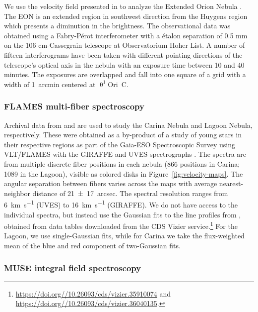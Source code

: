 \documentclass[fleqn,usenatbib, useAMS, a4paper]{mnras}
\begin{document}
We use the velocity field presented in \citet{1987A&A...176..347H} to analyze the Extended Orion Nebula \citetext{EON henceforth;  \citealp{2008Sci...319..309G}}.
The EON is an extended region in southwest direction from the Huygens region which presents a diminution in the brightness.
The observational data was obtained using a Fabry-Pérot interferometer with a étalon separation of 0.5 mm on the 106 cm-Cassegrain telescope at Observatorium Hoher List. 
A number of fifteen interferograms have been taken with different pointing directions of the telescope's optical axis in the nebula with an exposure time between 10 and 40 minutes. 
The exposures are overlapped and fall into one square of a grid with a width of \SI{1}{arcmin} centered at \(\uptheta^{1}\)Ori~C.   


\subsubsection{FLAMES multi-fiber spectroscopy}
\label{sec:flames-multi-fiber}

Archival data from \citet{Damiani:2016a} and \citet{Damiani:2017b} are used
to study the Carina Nebula and Lagoon Nebula, respectively.
These were obtained as a by-product of a study of young stars in their respective regions
as part of the Gaia-ESO Spectroscopic Survey \citep{Gilmore:2012v, Randich:2013m}
using VLT/FLAMES with the GIRAFFE and UVES spectrographs \citep{2002Msngr.110....1P}.
The spectra are from multiple discrete fiber positions in each nebula
(866 positions in Carina; 1089 in the Lagoon),
visible as colored disks in Figure~\ref{fig:velocity-maps}.
The angular separation between fibers varies across the maps with
average nearest-neighbor distance of \SI{21 \pm 17}{arcsec}.
The spectral resolution ranges from  \SI{6}{km.s^{-1}} (UVES) to \SI{16}{km.s^{-1}} (GIRAFFE).
We do not have access to the individual spectra, but instead use the
Gaussian fits to the line profiles from \citep{Damiani:2016a, Damiani:2017b},
obtained from data tables downloaded from the CDS Vizier service.\footnote{%
  \url{https://doi.org//10.26093/cds/vizier.35910074} and
  \url{https://doi.org//10.26093/cds/vizier.36040135}.}
For the Lagoon, we use single-Gaussian fits, while for Carina we take the
flux-weighted mean of the blue and red component of two-Gaussian fits.


\subsubsection{MUSE integral field spectroscopy}
\label{sec:muse-integral-field}
\end{document}
